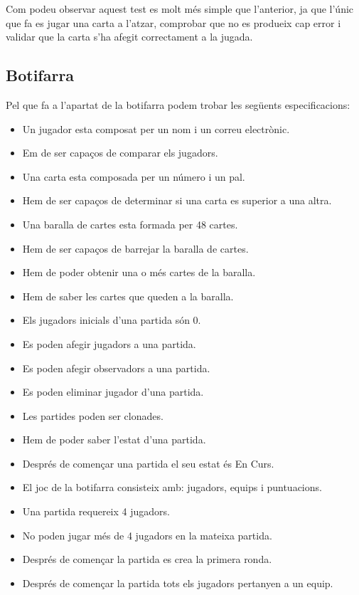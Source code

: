 Com podeu observar aquest test es molt més simple que l'anterior, ja que l'únic que fa es jugar una carta a l'atzar, comprobar que no es produeix cap error i validar que la carta s'ha afegit correctament a la jugada.

\subsection{Botifarra}

Pel que fa a l'apartat de la botifarra podem trobar les següents especificacions:

\begin{itemize}
    \item{Un jugador esta composat per un nom i un correu electrònic.}
    \item{Em de ser capaços de comparar els jugadors.}
   \item{Una carta esta composada per un número i un pal.}
    \item{Hem de ser capaços de determinar si una carta es superior a una altra.}
    \item{Una baralla de cartes esta formada per 48 cartes.}
    \item{Hem de ser capaços de barrejar la baralla de cartes.}
    \item{Hem de poder obtenir una o més cartes de la baralla.}
   \item{Hem de saber les cartes que queden a la baralla.}
    \item{Els jugadors inicials d'una partida són 0.}
    \item{Es poden afegir jugadors a una partida.}
    \item{Es poden afegir observadors a una partida.}
    \item{Es poden eliminar jugador d'una partida.}
    \item{Les partides poden ser clonades.}
    \item{Hem de poder saber l'estat d'una partida.}
    \item{Després de començar una partida el seu estat és En Curs.}
    \item{El joc de la botifarra consisteix amb: jugadors, equips i puntuacions.}
    \item{Una partida requereix 4 jugadors.}
    \item{No poden jugar més de 4 jugadors en la mateixa partida.}
    \item{Després de començar la partida es crea la primera ronda.}
    \item{Després de començar la partida tots els jugadors pertanyen a un equip.}

\end{itemize}
